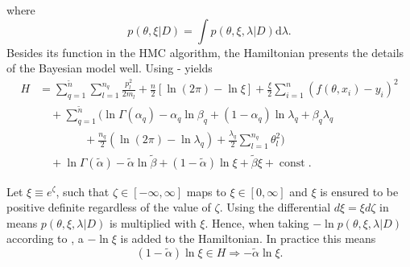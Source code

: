 where 
\begin{equation}
	p(\theta,\xi|D) = \int p(\theta,\xi,\lambda|D) \mathrm{d}\lambda.
	\label{eq:ss}
\end{equation}
Besides its function in the HMC algorithm, the Hamiltonian presents the details of the Bayesian model well. Using - yields
\begin{equation}
	\begin{split}
		H&=\sum_{q=1}^{\tilde{n}}\sum_{l=1}^{n_q}\frac{p_{l}^2}{2m_{l}}+\frac{n}{2}[\ln(2\pi)-\ln\xi] +\frac{\xi}{2}\sum_{i=1}^{n}(f(\theta,x_i)-y_i)^2\\
		&\quad+\sum_{q=1}^{\tilde{n}}\bigg(\ln\Gamma(\alpha_q)-\alpha_q\ln\beta_q+(1-\alpha_q)\ln\lambda_q+\beta_q\lambda_q\\
		&\qquad\qquad+\frac{n_q}{2}(\ln(2\pi)-\ln\lambda_q)+\frac{\lambda_q}{2}\sum_{l=1}^{n_q}\theta_l^2\bigg)\\
		&\quad+\ln\Gamma(\tilde{\alpha})-\tilde{\alpha}\ln\tilde{\beta}+(1-\tilde{\alpha})\ln\xi+\tilde{\beta}\xi+\operatorname{const}.
	\end{split}
	\label{eqh2}
\end{equation}

\begin{example}
	Let $\xi \equiv e^\zeta$, such that $\zeta\in [-\infty,\infty]$ maps to $\xi\in[0,\infty]$ and $\xi$ is ensured to be positive definite regardless of the value of $\zeta$. Using the differential $d\xi =  \xi d\zeta$ in  means $p(\theta,\xi,\lambda|D)$ is multiplied with $\xi$. Hence, when taking $-\ln p(\theta,\xi,\lambda|D)$ according to , a $-\ln\xi$ is added to the Hamiltonian. In practice this means
	\begin{equation}
		(1-\tilde{\alpha})\ln\xi\in H\Rightarrow -\tilde{\alpha}\ln\xi.
	\end{equation} 	
\end{example}

